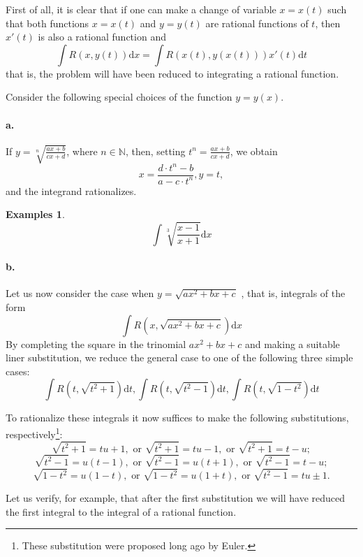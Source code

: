 \documentclass[a4paper,12pt]{article} %
\newtheorem{example}{Examples}
\begin{document}
First of all, it is clear that if one can make a change of variable 
$x = x(t)$ such that both functions $x = x(t)$ and $y = y(t)$ are rational 
functions of $t$, then $x'(t)$ is also a rational function and 
\[
    \int R(x,y(t))\mathrm{d}x = \int R(x(t),y(x(t)))x'(t)\mathrm{d}t
    \]
that is, the problem will have been reduced to integrating a rational 
function.

Consider the following special choices of the function $y = y(x)$.
\paragraph{\rm \textbf{a.}} If $\displaystyle y = \sqrt[n]{\frac{ax+b}
{cx+d}}$, where $n \in \mathbb{N}$, then, setting $\displaystyle t^n = \frac{ax+b}{cx+d}$,
we obtain 
\[
    x = \frac{d\cdot t^n - b}{a - c\cdot t^n}, y = t,
    \]
and the integrand rationalizes.
\begin{example}
    \[
        \int \sqrt[3]{\frac{x-1}{x+1}}\mathrm{d}x
        \]
\end{example}
\paragraph{\rm \textbf{b.}} Let us now consider the case when $y = \sqrt{ax^2 + bx + c}$
, that is, integrals of the form 
\[
    \int R(x,\sqrt{ax^2 + bx + c})\mathrm{d}x
    \]
By completing the square in the trinomial $ax^2 + bx + c$ and making a 
suitable liner substitution, we reduce the general case to one of the 
following three simple cases:
\begin{equation}
    \int R(t,\sqrt{t^2 + 1})\mathrm{d}t, 
    \int R(t,\sqrt{t^2 - 1})\mathrm{d}t, 
    \int R(t,\sqrt{1 - t^2})\mathrm{d}t
    \label{eq:eq4}
\end{equation}

To rationalize these integrals it now suffices to make the following 
substitutions, respectively\footnote{These substitution were proposed
long ago by Euler.}:
\[
    \sqrt{t^2 + 1} = tu + 1, \text{ or } \sqrt{t^2 + 1} = tu - 1, 
    \text{ or }\sqrt{t^2 + 1} = t - u;
    \]
\[
    \sqrt{t^2 - 1} = u(t-1), \text{ or } \sqrt{t^2 - 1} = u(t+1),
    \text{ or } \sqrt{t^2 - 1} = t - u;
    \]
\[
    \sqrt{1 - t^2} = u(1 - t), \text{ or } \sqrt{1 - t^2} = u(1+t),
    \text{ or } \sqrt{t^2 - 1} = tu \pm 1.
    \]

Let us verify, for example, that after the first substitution we will 
have reduced the first integral to the integral of a rational function.
\end{document}
